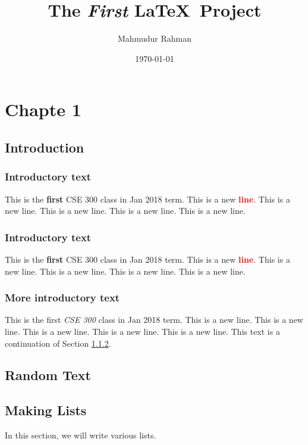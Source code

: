 \documentclass{book}
\title{The \textit{First} \LaTeX ~\textbf{Project}}
\author{Mahmudur Rahman}
\date{\today}
\begin{document}
\maketitle

\newpage

\tableofcontents

\newpage

\chapter{Chapte 1}

\section{Introduction}

\subsection{Introductory text}
This is the \textbf{first} CSE 300 class in Jan 2018 term.
This is a new \textcolor{red}{\textbf{line}}.
This is a new line.
This is a new line.
This is a new line.
This is a new line.


\subsection{Introductory text}
\label{sec:intro_text}
This is the \textbf{first} CSE 300 class in Jan 2018 term.
This is a new \textcolor{red}{\textbf{line}}.
This is a new line.
This is a new line.
This is a new line.
This is a new line.

\subsection{More introductory text}
This is the first \textit{CSE 300} class in Jan 2018 term.
This is a new line.
This is a new line.
This is a new line.
This is a new line.
This is a new line. This text is a continuation of Section \ref{sec:intro_text}.

\section{Random Text}

\lipsum

\section{Making Lists}
In this section, we will write various lists.
\end{document}
